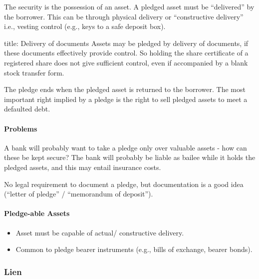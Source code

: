 \documentclass[
]{article}
\newenvironment{Shaded}{}{}
\newcommand{\NormalTok}[1]{#1}
\providecommand{\tightlist}{%
  \setlength{\itemsep}{0pt}\setlength{\parskip}{0pt}}
\begin{document}
The security is the possession of an asset. A pledged asset must be
``delivered'' by the borrower. This can be through physical delivery or
``constructive delivery'' i.e., vesting control (e.g., keys to a safe
deposit box).

\begin{Shaded}
\begin{Highlighting}[]
\NormalTok{title: Delivery of documents}
\NormalTok{Assets may be pledged by delivery of documents, if these documents effectively provide control. So holding the share certificate of a registered share does not give sufficient control, even if accompanied by a blank stock transfer form. }
\end{Highlighting}
\end{Shaded}

The pledge ends when the pledged asset is returned to the borrower. The
most important right implied by a pledge is the right to sell pledged
assets to meet a defaulted debt.

\hypertarget{problems}{%
\paragraph{Problems}\label{problems}}

A bank will probably want to take a pledge only over valuable assets -
how can these be kept secure? The bank will probably be liable as bailee
while it holds the pledged assets, and this may entail insurance costs.

No legal requirement to document a pledge, but documentation is a good
idea (``letter of pledge'' / ``memorandum of deposit'').

\hypertarget{pledge-able-assets}{%
\paragraph{Pledge-able Assets}\label{pledge-able-assets}}

\begin{itemize}
\tightlist
\item
  Asset must be capable of actual/ constructive delivery.
\item
  Common to pledge bearer instruments (e.g., bills of exchange, bearer
  bonds).
\end{itemize}

\hypertarget{lien}{%
\subsubsection{Lien}\label{lien}}
\end{document}
